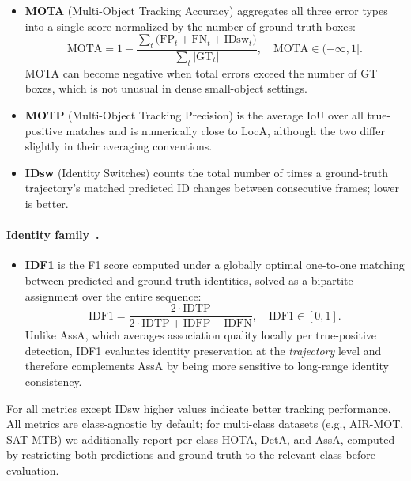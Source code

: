 \documentclass{article}
\begin{document}
\begin{itemize}
    \item \textbf{MOTA} (Multi-Object Tracking Accuracy) aggregates all
    three error types into a single score normalized by the number of
    ground-truth boxes:
    \begin{equation}
        \mathrm{MOTA} = 1 -
        \frac{\sum_{t}\bigl(\mathrm{FP}_{t} + \mathrm{FN}_{t} +
        \mathrm{IDsw}_{t}\bigr)}{\sum_{t}|\mathrm{GT}_{t}|},
        \quad \mathrm{MOTA} \in (-\infty, 1].
    \end{equation}
    MOTA can become negative when total errors exceed the number of GT
    boxes, which is not unusual in dense small-object settings.

    \item \textbf{MOTP} (Multi-Object Tracking Precision) is the average
    IoU over all true-positive matches and is numerically close to LocA,
    although the two differ slightly in their averaging conventions.

    \item \textbf{IDsw} (Identity Switches) counts the total number of
    times a ground-truth trajectory's matched predicted ID changes
    between consecutive frames; lower is better.
\end{itemize}

\paragraph{Identity family~\citep{ristani2016idf1}.}
\begin{itemize}
    \item \textbf{IDF1} is the F1 score computed under a globally optimal
    one-to-one matching between predicted and ground-truth identities,
    solved as a bipartite assignment over the entire sequence:
    \begin{equation}
        \mathrm{IDF1} =
        \frac{2 \cdot \mathrm{IDTP}}
        {2 \cdot \mathrm{IDTP} + \mathrm{IDFP} + \mathrm{IDFN}},
        \quad \mathrm{IDF1} \in [0, 1].
    \end{equation}
    Unlike AssA, which averages association quality locally per
    true-positive detection, IDF1 evaluates identity preservation at the
    \emph{trajectory} level and therefore complements AssA by being more
    sensitive to long-range identity consistency.
\end{itemize}

For all metrics except IDsw higher values indicate better tracking
performance. All metrics are class-agnostic by default; for multi-class
datasets (e.g., AIR-MOT, SAT-MTB) we additionally report per-class HOTA,
DetA, and AssA, computed by restricting both predictions and ground
truth to the relevant class before evaluation.
\end{document}
